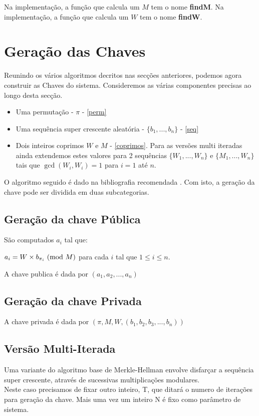 \documentclass[11pt, language=portuguese]{report}
\begin{document}
Na implementação, a função que calcula um $M$ tem o nome \textbf{findM}.
Na implementação, a função que calcula um $W$ tem o nome \textbf{findW}.

\section{Geração das Chaves}
\label{gkey}
Reunindo os vários algoritmos decritos nas secções anteriores, podemos agora construir as Chaves do sistema.
Consideremos as várias componentes precisas ao longo desta secção.
\begin{itemize}
	\item Uma permutação - $\pi$ - \ref{perm}
	\item Uma sequência super crescente aleatória - $\{b_1, ..., b_n\}$ - \ref{seq}
	\item Dois inteiros coprimos $W$ e $M$ - \ref{coprimos}. Para as versões multi iteradas ainda extendemos estes valores para 2 sequências $\{W_1, ..., W_n\}$ e $\{M_1, ..., W_n\}$ tais que $\gcd(W_i, W_i) = 1$ para $i = 1$ até $n$.
\end{itemize}

O algoritmo seguido é dado na bibliografia recomendada \autocite{handbook}.
Com isto, a geração da chave pode ser dividida em duas subcategorias.

\subsection{Geração da chave Pública}
\begin{definition}\label{def:4}
	São computados ${a_i}$ tal que:
	\begin{center}
		$a_i = W \times b_{\pi_i} \ (\mathrm{mod}\ M)$ para cada $i$ tal que $1 \le i \le n$.
        \end{center}
\end{definition}
A chave publica é dada por $({a_1, a_2, ..., a_n})$

\subsection{Geração da chave Privada}
A chave privada é dada por $(\pi, M, W, {(b_1, b_2, b_3, ..., b_n)})$

\subsection{Versão Multi-Iterada}
Uma variante do algoritmo base de Merkle-Hellman envolve disfarçar a sequência super crescente, através de sucessivas multiplicações modulares.
\\
Neste caso precisamos de fixar outro inteiro, T, que ditará o numero de iterações para geração da chave.
Mais uma vez um inteiro N é fixo como parâmetro de sistema.
\\
\end{document}
